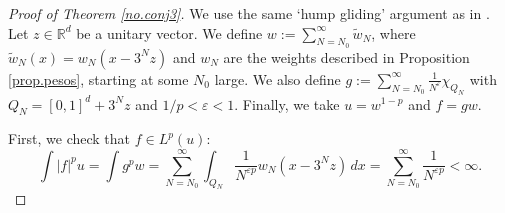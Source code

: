 \documentclass[11pt]{amsart}
\theoremstyle{definition}
\begin{document}
\begin{proof}[Proof of Theorem \ref{no.conj3}]
We use the same `hump gliding' argument as in \cite{RegueraScurry}. Let $z\in {\mathbb{R}}^d$ be a unitary vector. We define $w:=\sum_{N=N_0}^\infty \widetilde w_N$, where $\widetilde w_N(x)=w_N(x-3^Nz)$ and $w_N$ are the weights described in Proposition \ref{prop.pesos}, starting at some $N_0$ large. We also define  $g:=\sum_{N=N_0}^\infty \frac1{N^{\varepsilon}}\chi_{Q_N}$ with $Q_N=[0,1]^d+3^Nz$ and $1/p<{\varepsilon}<1$. Finally, we take $u=w^{1-p}$ and $f=gw$.

\bigskip

First, we check that  $f\in L^p(u)$:
\begin{equation*}
\int |f|^p u =  \int g^p w= \sum_{N=N_0}^\infty \int_{Q_N} \frac1{N^{{\varepsilon} p}}w_N(x-3^Nz)\,dx = \sum_{N=N_0}^\infty \frac1{N^{{\varepsilon} p}}<\infty.
\end{equation*}

\bigskip


\end{proof}
\end{document}
